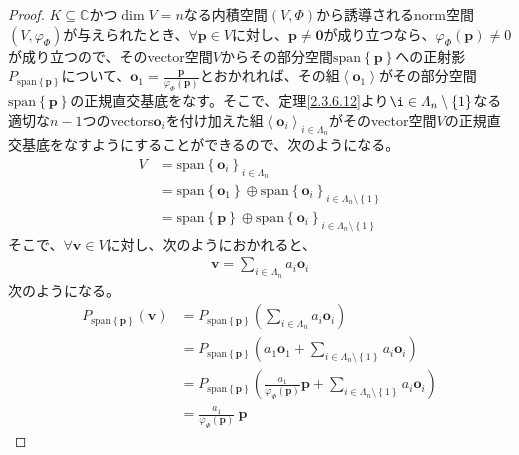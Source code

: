 \documentclass[dvipdfmx]{jsarticle}
\begin{document}
\begin{proof}
$K \subseteq \mathbb{C}$かつ$\dim V = n$なる内積空間$(V,\varPhi )$から誘導されるnorm空間$\left( V,\varphi_{\varPhi } \right)$が与えられたとき、$\forall\mathbf{p} \in V$に対し、$\mathbf{p} \neq \mathbf{0}$が成り立つなら、$\varphi_{\varPhi }\left( \mathbf{p} \right) \neq 0$が成り立つので、そのvector空間$V$からその部分空間$\mathrm{span}\left\{ \mathbf{p} \right\}$への正射影$P_{\mathrm{span}\left\{ \mathbf{p} \right\}}$について、$\mathbf{o}_{1} = \frac{\mathbf{p}}{\varphi_{\varPhi }\left( \mathbf{p} \right)}$とおかれれば、その組$\left\langle \mathbf{o}_{1} \right\rangle$がその部分空間$\mathrm{span}\left\{ \mathbf{p} \right\}$の正規直交基底をなす。そこで、定理\ref{2.3.6.12}より$\i \in \varLambda_{n} \setminus \left\{ 1 \right\}$なる適切な$n - 1$つのvectors$\mathbf{o}_{i}$を付け加えた組$\left\langle \mathbf{o}_{i} \right\rangle_{i \in \varLambda_{n}}$がそのvector空間$V$の正規直交基底をなすようにすることができるので、次のようになる。
\begin{align*}
V &= \mathrm{span}\left\{ \mathbf{o}_{i} \right\}_{i \in \varLambda_{n}}\\
&= \mathrm{span}\left\{ \mathbf{o}_{1} \right\} \oplus \mathrm{span}\left\{ \mathbf{o}_{i} \right\}_{i \in \varLambda_{n} \setminus \left\{ 1 \right\}}\\
&= \mathrm{span}\left\{ \mathbf{p} \right\} \oplus \mathrm{span}\left\{ \mathbf{o}_{i} \right\}_{i \in \varLambda_{n} \setminus \left\{ 1 \right\}}
\end{align*}
そこで、$\forall\mathbf{v} \in V$に対し、次のようにおかれると、
\begin{align*}
\mathbf{v} = \sum_{i \in \varLambda_{n}} {a_{i}\mathbf{o}_{i}}
\end{align*}
次のようになる。
\begin{align*}
P_{\mathrm{span}\left\{ \mathbf{p} \right\}}\left( \mathbf{v} \right) &= P_{\mathrm{span}\left\{ \mathbf{p} \right\}}\left( \sum_{i \in \varLambda_{n}} {a_{i}\mathbf{o}_{i}} \right)\\
&= P_{\mathrm{span}\left\{ \mathbf{p} \right\}}\left( a_{1}\mathbf{o}_{1} + \sum_{i \in \varLambda_{n} \setminus \left\{ 1 \right\}} {a_{i}\mathbf{o}_{i}} \right)\\
&= P_{\mathrm{span}\left\{ \mathbf{p} \right\}}\left( \frac{a_{1}}{\varphi_{\varPhi }\left( \mathbf{p} \right)}\mathbf{p} + \sum_{i \in \varLambda_{n} \setminus \left\{ 1 \right\}} {a_{i}\mathbf{o}_{i}} \right)\\
&= \frac{a_{1}}{\varphi_{\varPhi }\left( \mathbf{p} \right)}\mathbf{\ p}

\end{align*}
\end{proof}
\end{document}
